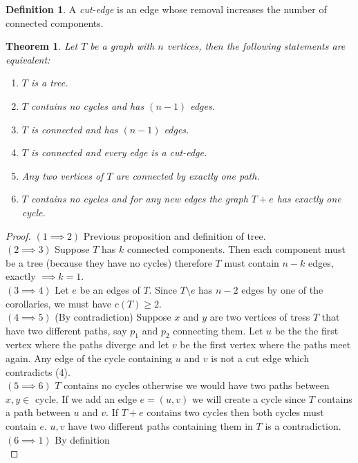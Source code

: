 \documentclass{article}
\newtheorem*{thm}{Theorem}
\theoremstyle{definition}
\newtheorem*{defn}{Definition}
\begin{document}
\begin{defn}
A \emph{cut-edge} is an edge whose removal increases the number of connected components.
\end{defn}

\begin{thm}
Let $T$ be a graph with $n$ vertices, then the following statements are equivalent:
\begin{enumerate}
\item $T$ is a tree.
\item $T$ contains no cycles and has $(n-1)$ edges.
\item $T$ is connected and has $(n-1)$ edges.
\item $T$ is connected and every edge is a cut-edge.
\item Any two vertices of $T$ are connected by exactly one path.
\item $T$ contains no cycles and for any new edges the graph $T + e$ has exactly one cycle.
\end{enumerate}
\end{thm}

\begin{proof}
$(1\implies 2)$ Previous proposition and definition of tree. \\
$(2\implies 3)$ Suppose $T$ has $k$ connected components.
Then each component must be a tree (because they have no cycles) therefore $T$ must contain $n-k$ edges, exactly $\implies k=1$. \\
$(3\implies 4)$ Let $e$ be an edges of $T$.
Since $T\setminus e$ has $n-2$ edges by one of the corollaries, we must have $c(T)\ge 2$. \\
$(4\implies 5)$ (By contradiction) Suppose $x$ and $y$ are two vertices of tress $T$ that have two different paths, say $p_1$ and $p_2$ connecting them.
Let $u$ be the the first vertex where the paths diverge and let $v$ be the first vertex where the paths meet again.
Any edge of the cycle containing $u$ and $v$ is not a cut edge which contradicts (4). \\
$(5\implies 6)$ $T$ contains no cycles otherwise we would have two paths between $x,y\in$ cycle.
If we add an edge $e= (u,v)$ we will create a cycle since $T$ contains a path between $u$ and $v$. If $T+e$ contains two cycles then both cycles must contain $e$.
$u,v$ have two different paths containing them in $T$ is a contradiction. \\
$(6\implies 1)$ \lbrack By definition \rbrack \\
\end{proof}
\end{document}
